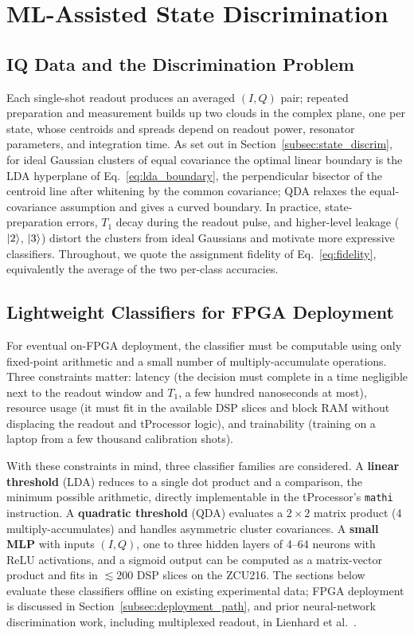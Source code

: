 \section{ML-Assisted State Discrimination}
\label{sec:ml}

\subsection{IQ Data and the Discrimination Problem}

Each single-shot readout produces an averaged $(I, Q)$ pair; repeated preparation
and measurement builds up two clouds in the complex plane, one per state, whose
centroids and spreads depend on readout power, resonator parameters, and
integration time.  As set
out in Section~\ref{subsec:state_discrim}, for ideal Gaussian clusters of equal
covariance the optimal linear boundary is the LDA hyperplane of
Eq.~\ref{eq:lda_boundary}, the perpendicular bisector of the centroid line after
whitening by the common covariance; QDA relaxes the equal-covariance assumption and gives
a curved boundary.  In practice, state-preparation errors, $T_1$ decay during the
readout pulse, and higher-level leakage ($\ket{2}$, $\ket{3}$) distort the clusters
from ideal Gaussians and motivate more expressive classifiers.  Throughout, we
quote the assignment fidelity of Eq.~\ref{eq:fidelity}, equivalently the average
of the two per-class accuracies.

\subsection{Lightweight Classifiers for FPGA Deployment}
\label{subsec:classifiers}

For eventual on-FPGA deployment, the classifier must be computable using only
fixed-point arithmetic and a small number of multiply-accumulate operations.  Three
constraints matter: latency (the decision must complete in a time negligible next
to the readout window and $T_1$, a few hundred nanoseconds at most),
resource usage (it must fit in the available DSP slices and block RAM without
displacing the readout and tProcessor logic), and trainability (training on a
laptop from a few thousand calibration shots).

With these constraints in mind, three classifier families are considered.  A
\textbf{linear threshold} (LDA) reduces to a single dot product and a
comparison, the minimum possible arithmetic, directly implementable in the
tProcessor's \texttt{mathi} instruction.  A \textbf{quadratic threshold} (QDA)
evaluates a $2\times2$ matrix product (4 multiply-accumulates) and handles
asymmetric cluster covariances.  A \textbf{small MLP} with inputs $(I, Q)$, one
to three hidden layers of 4–64 neurons with ReLU activations, and a sigmoid output
can be computed as a matrix-vector product and fits in $\lesssim 200$ DSP
slices on the ZCU216.  The sections below evaluate these classifiers offline on
existing experimental data; FPGA deployment is discussed in
Section~\ref{subsec:deployment_path}, and prior neural-network discrimination
work, including multiplexed readout, in Lienhard et al.~\cite{Lienhard2022}.

